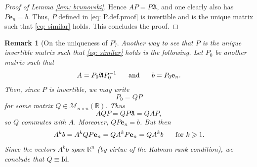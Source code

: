 \documentclass[11pt, a4paper, reqno]{amsart}
\newcommand{\R}{\mathbb{R}}
\theoremstyle{plain}
\numberwithin{equation}{section}
\newtheorem{remark}{Remark}
\begin{document}
\begin{proof}[Proof of Lemma \ref{lem: brunovski}]
Hence $AP= P\mathfrak{A}$, and one clearly also has $P\mathbf{e}_n = b$.
Thus, $P$ defined in \eqref{eq: P.def.proof} is invertible and is the unique matrix such that \eqref{eq: similar} holds.
	This concludes the proof.
	\end{proof}
	
	\begin{remark}[On the uniqueness of $P$]
	Another way to see that $P$ is the unique invertible matrix such that \eqref{eq: similar} holds is the following. Let $P_0$ be another matrix such that
	\begin{equation}
	A=P_0\mathfrak{A}P_0^{-1} \hspace{0.5cm} \text{ and } \hspace{0.5cm} b=P_0\mathbf{e}_n.
	\end{equation}
	Then, since $P$ is invertible, we may write
	\begin{equation}
	P_0 = QP
	\end{equation}
	for some matrix $Q \in \mathcal{M}_{n\times n}(\R)$.
	Thus 
	\begin{equation}
	AQP = QP\mathfrak{A} = QAP,
	\end{equation}
	so $Q$ commutes with $A$. Moreover, $QP\mathbf{e}_n = b$.
	But then
	\begin{equation}
	A^k b = A^k QP\mathbf{e}_n = QA^k P\mathbf{e}_n = QA^k b \hspace{0.5cm} \text{ for } k\geqslant 1.
	\end{equation}
	Since the vectors $A^k b$ span $\R^n$ (by virtue of the Kalman rank condition), we conclude that $Q\equiv\mathrm{Id}$.
	\end{remark}

	
		

	{}

		
\end{document}
